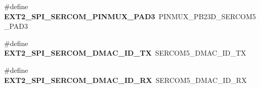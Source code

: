 \begin{DoxyCompactItemize}
\item 
\hypertarget{group__saml21__xplained__pro__features__group_ga64c0756fb7fe251282040ab588f85a22}{}\#define {\bfseries E\+X\+T2\+\_\+\+S\+P\+I\+\_\+\+S\+E\+R\+C\+O\+M\+\_\+\+P\+I\+N\+M\+U\+X\+\_\+\+P\+A\+D3}~P\+I\+N\+M\+U\+X\+\_\+\+P\+B23\+D\+\_\+\+S\+E\+R\+C\+O\+M5\+\_\+\+P\+A\+D3\label{group__saml21__xplained__pro__features__group_ga64c0756fb7fe251282040ab588f85a22}

\item 
\hypertarget{group__saml21__xplained__pro__features__group_gae51875d4b3e7f052c4c890f1d7f17e77}{}\#define {\bfseries E\+X\+T2\+\_\+\+S\+P\+I\+\_\+\+S\+E\+R\+C\+O\+M\+\_\+\+D\+M\+A\+C\+\_\+\+I\+D\+\_\+\+T\+X}~S\+E\+R\+C\+O\+M5\+\_\+\+D\+M\+A\+C\+\_\+\+I\+D\+\_\+\+T\+X\label{group__saml21__xplained__pro__features__group_gae51875d4b3e7f052c4c890f1d7f17e77}

\item 
\hypertarget{group__saml21__xplained__pro__features__group_gabb9be2528657d27487091c865dfc956f}{}\#define {\bfseries E\+X\+T2\+\_\+\+S\+P\+I\+\_\+\+S\+E\+R\+C\+O\+M\+\_\+\+D\+M\+A\+C\+\_\+\+I\+D\+\_\+\+R\+X}~S\+E\+R\+C\+O\+M5\+\_\+\+D\+M\+A\+C\+\_\+\+I\+D\+\_\+\+R\+X\label{group__saml21__xplained__pro__features__group_gabb9be2528657d27487091c865dfc956f}

\end{DoxyCompactItemize}
